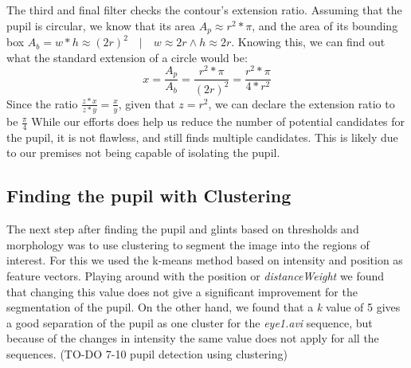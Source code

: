 \newline
The third and final filter checks the contour's extension ratio. Assuming that the pupil is circular, we know that its area \(A_p \approx r^2*\pi\), and the area of its bounding box \(A_b = w*h \approx (2r)^2 \quad | \quad w \approx 2r \wedge h \approx 2r\). Knowing this, we can find out what the standard extension of a circle would be:
\[x = \frac{A_p}{A_b} = \frac{r^2*\pi}{(2r)^2} = \frac{r^2*\pi}{4*r^2}\]
Since the ratio \(\frac{z*x}{z*y} = \frac{x}{y}\), given that \(z = r^2\), we can declare the extension ratio to be \(\frac{\pi}{4}\)
\newline
\newline
While our efforts does help us reduce the number of potential candidates for the pupil, it is not flawless, and still finds multiple candidates. This is likely due to our premises not being capable of isolating the pupil.

\subsection{Finding the pupil with Clustering}
The next step after finding the pupil and glints based on thresholds and morphology was to use clustering to segment the image into the regions of interest. For this we used the k-means method based on intensity and position as feature vectors. Playing around with the position or \emph{distanceWeight} we found that changing this value does not give a significant improvement for the segmentation of the pupil. On the other hand, we found that a \emph{k} value of 5 gives a good separation of the pupil as one cluster for the \emph{eye1.avi} sequence, but because of the changes in intensity the same value does not apply for all the sequences.  
(TO-DO 7-10 pupil detection using clustering)